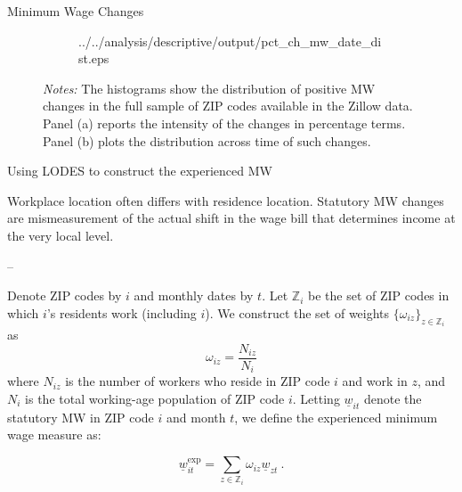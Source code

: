 \documentclass[ignorenonframetext,aspectratio=169]{beamer}
\begin{document}
\begin{frame}{Minimum Wage Changes}
\begin{figure}[h!]
\begin{subfigure}{.49\textwidth}
            {../../analysis/descriptive/output/pct_ch_mw_date_dist.eps}
    \end{subfigure}
    \begin{minipage}{.95\textwidth} \footnotesize
        \vspace{3mm}
        \textit{Notes:} The histograms show the distribution of positive MW changes 
        in the full sample of ZIP codes available in the Zillow data. Panel (a) reports 
        the intensity of the changes in percentage terms. Panel (b) plots the distribution 
        across time of such changes. 
    \end{minipage}
\end{figure}

\end{frame}

\begin{frame}{Using LODES to construct the experienced MW}
\protect\hypertarget{using-lodes-to-construct-the-experienced-mw}{}

Workplace location often differs with residence location. \to Statutory
MW changes are mismeasurement of the actual shift in the wage bill that
determines income at the very local level.

--

Denote ZIP codes by \(i\) and monthly dates by \(t\). Let
\(\mathds{Z}_i\) be the set of ZIP codes in which \(i\)'s residents work
(including \(i\)). We construct the set of weights
\(\{\omega_{iz}\}_{z \in \mathds{Z}_i}\) as
\[\omega_{iz} = \frac{N_{iz}}{N_i} \] where \(N_{iz}\) is the number of
workers who reside in ZIP code \(i\) and work in \(z\), and \(N_i\) is
the total working-age population of ZIP code \(i\). Letting
\(\underline{w}_{it}\) denote the statutory MW in ZIP code \(i\) and
month \(t\), we define the experienced minimum wage measure as:

\begin{equation}
    \underline{w}^{\text{exp}}_{it} = 
            \sum_{z \in \mathds{Z}_i} \omega_{iz} \underline{w}_{zt} \ . 
\end{equation}

\end{frame}
\end{document}
